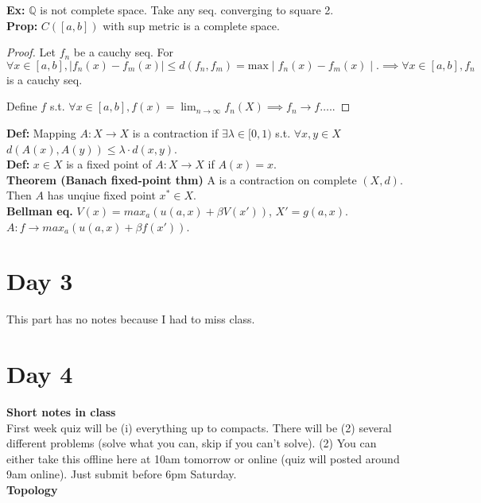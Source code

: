 \documentclass[a4paper]{article}
\newcommand{\Q}{\mathbb{Q}}
\begin{document}
\textbf{Ex:} $\Q$ is not complete space. Take any seq. converging to square 2.\\


\textbf{Prop:} $C\left( [a,b] \right) $ with sup metric is a complete space.
\begin{proof}
	Let $f_n$ be a cauchy seq. For $\forall x \in [a,b],  \mid f_n (x) - f_m (x)  \mid  \le  d(f_n, f_m) = \text{max}  \mid f_n (x) - f_m (x)  \mid . \implies \forall x \in [a,b], f_n$ is a cauchy seq. 

	Define $f$ s.t. $\forall x \in [a,b], f(x) = \lim_{n \to \infty} f_n (X) \implies f_n \to f\ldots..$
\end{proof}

\textbf{Def:} Mapping $A:X \to X$ is a contraction if $\exists \lambda \in [0,1)$ s.t. $\forall x, y \in X$ $d\left( A(x), A(y) \right) \le  \lambda \cdot d(x,y)$.\\

\textbf{Def:} $x \in X$ is a fixed point of $A: X \to X$ if $A(x)=x.$\\

\textbf{Theorem (Banach fixed-point thm)} A is a contraction on complete  $(X,d)$. Then $A$ has unqiue fixed point $x^{*} \in X.$ \\


\textbf{Bellman eq.} $V(x) = max_a \left( u(a,x) + \beta V(x') \right) $, $X' = g(a,x).$  $A:f \to max_a \left( u(a,x) + \beta f(x') \right) $.


\section{Day 3}

This part has no notes because I had to miss class.

\section{Day 4}

\textbf{Short notes in class}\\

First week quiz will be (i) everything up to compacts. There will be (2) several different problems (solve what you can, skip if you can't solve). (2) You can either take this offline here at 10am tomorrow or online (quiz will posted around 9am online). Just submit before 6pm Saturday.\\

\textbf{Topology}\\
\end{document}
